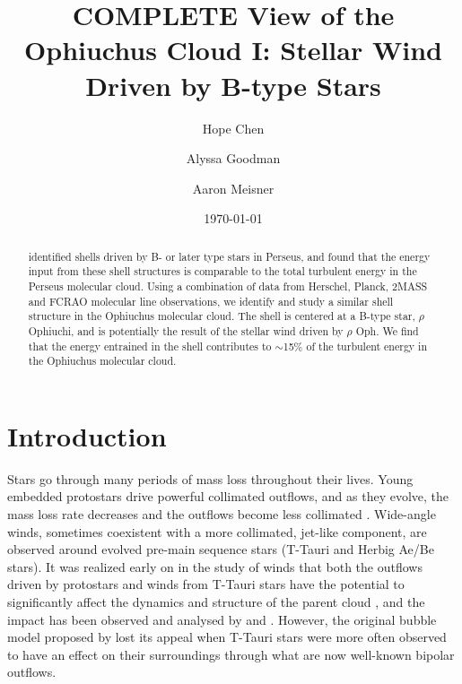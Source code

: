 \documentclass[11pt,a4paper]{emulateapj}
\begin{document}
\title{COMPLETE View of the Ophiuchus Cloud I: Stellar Wind Driven by B-type Stars}
\author{Hope Chen }
\author{Alyssa Goodman }
\author{Aaron Meisner }
\date{\today}

\begin{abstract}
\cite{Arce_2010} identified shells driven by B- or later type stars in Perseus, and found that the energy input from these shell structures is comparable to the total turbulent energy in the Perseus molecular cloud. Using a combination of data from Herschel, Planck, 2MASS and FCRAO molecular line observations, we identify and study a similar shell structure in the Ophiuchus molecular cloud. The shell is centered at a B-type star, $\rho$ Ophiuchi, and is potentially the result of the stellar wind driven by $\rho$ Oph. We find that the energy entrained in the shell contributes to $\sim$15\% of the turbulent energy in the Ophiuchus molecular cloud.
\end{abstract}

\section{Introduction} 
Stars go through many periods of mass loss throughout their lives. Young embedded protostars drive powerful collimated outflows, and as they evolve, the mass loss rate decreases and the outflows become less collimated \citep{Bontemps_1996,Arce_2006}. Wide-angle winds, sometimes coexistent with a more collimated, jet-like component, are observed around evolved pre-main sequence stars (T-Tauri and Herbig Ae/Be stars). It was realized early on in the study of winds that both the outflows driven by protostars and winds from T-Tauri stars have the potential to significantly affect the dynamics and structure of the parent cloud \citep{Norman_1980}, and the impact has been observed and analysed by \cite{Arce_2006} and \citet{Arce_2010}. However, the original bubble model proposed by \citet{Norman_1980} lost its appeal when T-Tauri stars were more often observed to have an effect on their surroundings through what are now well-known bipolar outflows.
\end{document}
